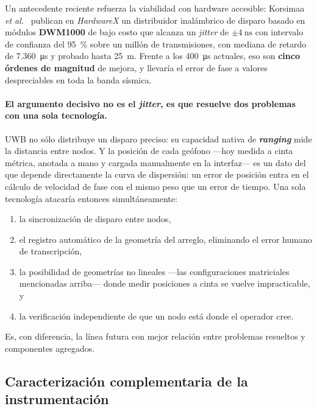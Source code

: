 Un antecedente reciente refuerza la viabilidad con hardware accesible: Korsimaa
\emph{et al.}~\cite{Korsimaa2025} publican en \emph{HardwareX} un distribuidor
inal\'ambrico de disparo basado en m\'odulos \textbf{DWM1000} de bajo costo que alcanza un
\emph{jitter} de \textbf{$\pm\SI{4}{\nano\second}$} con intervalo de confianza del
\SI{95}{\percent} sobre un mill\'on de transmisiones, con mediana de retardo de
\SI{7.360}{\micro\second} y probado hasta \SI{25}{\meter}. Frente a los
\SI{400}{\micro\second} actuales, eso son \textbf{cinco \'ordenes de magnitud} de mejora,
y llevar\'ia el error de fase a valores despreciables en toda la banda s\'ismica.

\paragraph{El argumento decisivo no es el \emph{jitter}, es que resuelve dos problemas
con una sola tecnolog\'ia.} UWB no s\'olo distribuye un disparo preciso: su capacidad
nativa de \textbf{\emph{ranging}} mide la distancia entre nodos. Y la posici\'on de cada
ge\'ofono ---hoy medida a cinta m\'etrica, anotada a mano y cargada manualmente en la
interfaz--- es un dato del que depende directamente la curva de dispersi\'on: un error de
posici\'on entra en el c\'alculo de velocidad de fase con el mismo peso que un error de
tiempo. Una sola tecnolog\'ia atacar\'ia entonces simult\'aneamente:

\begin{enumerate}[itemsep=0.1em]
    \item la sincronizaci\'on de disparo entre nodos,
    \item el registro autom\'atico de la geometr\'ia del arreglo, eliminando el error
    humano de transcripci\'on,
    \item la posibilidad de geometr\'ias no lineales ---las configuraciones matriciales
    mencionadas arriba--- donde medir posiciones a cinta se vuelve impracticable, y
    \item la verificaci\'on independiente de que un nodo est\'a donde el operador cree.
\end{enumerate}

Es, con diferencia, la l\'inea futura con mejor relaci\'on entre problemas resueltos y
componentes agregados.

\subsection{Caracterizaci\'on complementaria de la instrumentaci\'on}

